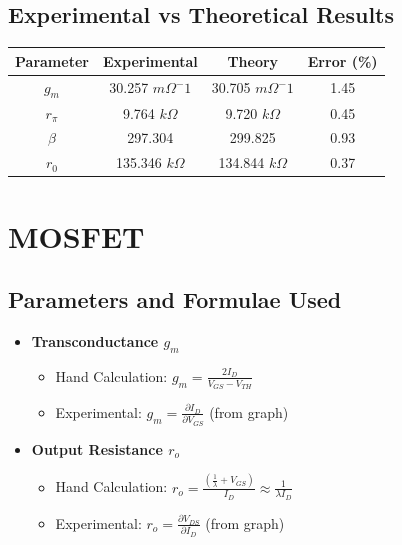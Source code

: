 \documentclass{article}
\begin{document}
\subsection*{Experimental vs Theoretical Results}
\begin{center}
\begin{tabular}{|c|c|c|c|}
\hline
Parameter & Experimental & Theory & Error (\%) \\
\hline
$g_m$    & 30.257  $m\Omega^-1$ & 30.705 $m\Omega^-1$ & 1.45 \\
$r_\pi$  & 9.764 $k\Omega$   & 9.720 $k\Omega$   & 0.45 \\
$\beta$  & 297.304 &   299.825                 & 0.93 \\
$r_0$ & 135.346 $k\Omega$ & 134.844 $k\Omega$  & 0.37 \\
\hline
\end{tabular}
\end{center}
\pagebreak
\section{MOSFET}
\subsection*{Parameters and Formulae Used}
\begin{itemize}
    \item \textbf{Transconductance $g_m$}
    \begin{itemize}
        \item Hand Calculation: $g_m = \frac{2I_D}{V_{GS}-V_{TH}}$
        \item Experimental: $g_m = \frac{\partial I_D}{\partial V_{GS}}$ (from graph)
    \end{itemize}
    \item \textbf{Output Resistance $r_o$}
    \begin{itemize}
        \item Hand Calculation: $r_o = \frac{\left( \frac{1}{\lambda} + V_{GS} \right)}{I_D} \approx \frac{1}{\lambda I_D}$
        \item Experimental: $r_o = \frac{\partial V_{DS}}{\partial I_D}$ (from graph)
    \end{itemize}
\end{itemize}
\end{document}
